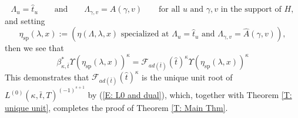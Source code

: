 \documentclass{article}
\theoremstyle{remark}
\def\c #1{ {\mathcal #1} }
\begin{document}
\[
\Lambda_u = \hat t_u \qquad \text{and} \qquad \Lambda_{\gamma, v} = \hat A(\gamma, v) \qquad \text{for all $u$ and $\gamma, v$ in the support of $H$},
\] 
and setting
\[
\eta_{\text{sp}}(\lambda, x) := \left( \eta(\Lambda, \lambda, x) \text{ specialized at $\Lambda_u = \hat t_u$ and $\Lambda_{\gamma, v} = \hat A(\gamma, v)$} \right),
\]
then we see that
\begin{equation}\label{E: unit root dual}
\beta_{\kappa, \bar t}^* \Upsilon(\eta_{\text{sp}}(\lambda, x))^\kappa = \c F_{a d(\bar t)}(\hat t)^\kappa \Upsilon(\eta_{\text{sp}}(\lambda, x))^\kappa 
\end{equation}
This demonstrates that $\c F_{a d(\bar t)}(\hat t)^\kappa$ is the unique unit root of $L^{(0)}(\kappa, \bar t, T)^{(-1)^{s+1}}$ by (\ref{E: L0  and dual}), which, together with Theorem \ref{T: unique unit}, completes the proof of Theorem \ref{T: Main Thm}.






\end{document}
